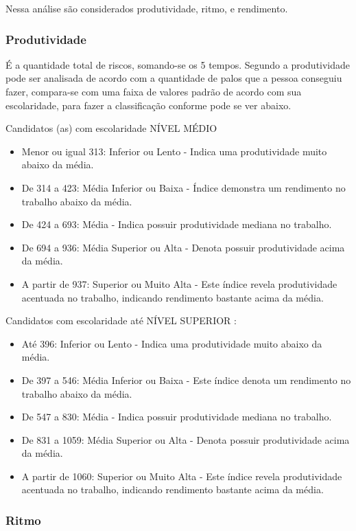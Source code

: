 Nessa análise são considerados produtividade, ritmo, e rendimento.

\subsubsection{Produtividade}
\label{subsub:avaquali}

É a quantidade total de riscos, somando-se os 5 tempos.
Segundo \cite{marcosjaime2013}  a produtividade pode ser analisada de acordo com a quantidade de palos que a pessoa conseguiu fazer, compara-se com uma faixa de valores padrão de acordo com sua escolaridade, para fazer a classificação conforme pode se ver abaixo.

Candidatos (as) com escolaridade NÍVEL MÉDIO
\begin{itemize}
\item Menor ou igual 313: Inferior ou Lento - Indica uma produtividade muito abaixo da média.
\item De 314 a 423: Média Inferior ou Baixa - Índice demonstra um rendimento no trabalho abaixo da média.
\item De 424 a 693: Média - Indica possuir produtividade mediana no trabalho.
\item De 694 a 936: Média Superior ou Alta - Denota possuir produtividade acima da média.
\item  A partir de 937: Superior ou Muito Alta - Este índice revela produtividade acentuada no trabalho, indicando rendimento bastante acima da média.
\end{itemize}

Candidatos com escolaridade até NÍVEL SUPERIOR :

\begin{itemize}
\item Até 396: Inferior ou Lento - Indica uma produtividade muito abaixo da média.
\item De 397 a 546: Média Inferior ou Baixa - Este índice denota um rendimento no trabalho abaixo da média.
\item De 547 a 830: Média - Indica possuir produtividade mediana no trabalho.
\item De 831 a 1059: Média Superior ou Alta - Denota possuir produtividade acima da média.
\item A partir de 1060: Superior ou Muito Alta - Este índice revela produtividade acentuada no
trabalho, indicando rendimento bastante acima da média.
\end{itemize}

\subsubsection{Ritmo}
\label{subsub:ritmo}

